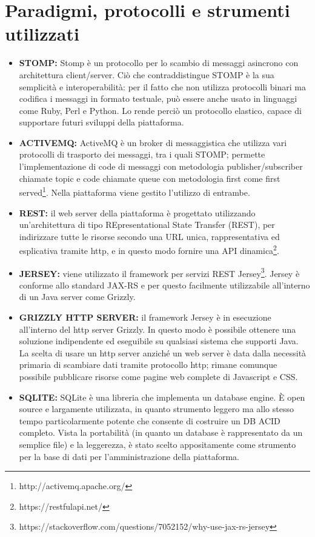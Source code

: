 \section{Paradigmi, protocolli e strumenti utilizzati}

\begin{itemize}
	\item \textbf{STOMP:} Stomp è un protocollo per lo scambio di messaggi asincrono con architettura client/server.
	Ciò che contraddistingue STOMP è la sua semplicità e interoperabilità: per il fatto che non utilizza
	protocolli binari ma codifica i messaggi in formato testuale, può essere anche usato in
	linguaggi come Ruby, Perl e Python. Lo rende perciò un protocollo elastico, capace di supportare futuri sviluppi della piattaforma.
	\item \textbf{ACTIVEMQ:} ActiveMQ è un broker di messaggistica che utilizza vari protocolli di trasporto dei messaggi, tra i quali STOMP; permette l’implementazione di code di messaggi con metodologia publisher/subscriber chiamate topic e code chiamate queue con metodologia first come first served\footnote{http://activemq.apache.org/}. Nella piattaforma viene gestito l'utilizzo di entrambe.
	\item \textbf{REST:} il web server della piattaforma è progettato utilizzando un’architettura di tipo REpresentational State Transfer (REST), per indirizzare tutte le risorse secondo una URL unica, rappresentativa ed esplicativa tramite http, e in questo modo fornire una API dinamica\footnote{https://restfulapi.net/}.
	\item \textbf{JERSEY:} viene utilizzato il framework per servizi REST Jersey\footnote{https://stackoverflow.com/questions/7052152/why-use-jax-rs-jersey}. Jersey è conforme allo standard JAX-RS e per questo facilmente utilizzabile all'interno di un Java server come Grizzly.
	\item \textbf{GRIZZLY HTTP SERVER:} il framework Jersey è in esecuzione all’interno del http server Grizzly. In questo modo è possibile ottenere una soluzione indipendente ed eseguibile su qualsiasi sistema che supporti Java. La scelta di usare un http server anziché un web server è data dalla necessità primaria di scambiare dati tramite protocollo http; rimane comunque possibile pubblicare risorse come pagine web complete di Javascript e CSS.
	\item \textbf{SQLITE:} SQLite è una libreria che implementa un database engine. È open source e largamente utilizzata, in quanto strumento leggero ma allo stesso tempo particolarmente potente che consente di costruire un DB ACID completo. Vista la portabilità (in quanto un database è rappresentato da un semplice file) e la leggerezza, è stato scelto appositamente come strumento per la base di dati per l’amministrazione della piattaforma.

\end{itemize}
